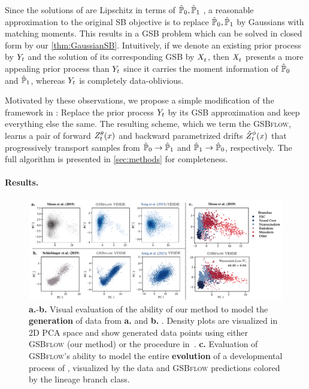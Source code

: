 Since the solutions of  are Lipschitz in terms of $\hat{\mathbb{P}}_{ {0} },\hat{\mathbb{P}}_{ {1}}$ \citep{carlier2022lipschitz}, a reasonable approximation to the original \acrshort{SB} objective is to replace $\hat{\mathbb{P}}_{ {0} },\hat{\mathbb{P}}_{ {1}}$ by Gaussians with matching moments. This results in a \acrshort{GSB} problem which can be solved in closed form by our \cref{thm:GaussianSB}. Intuitively, if we denote an existing prior process by $Y_{ t }$ and the solution of its corresponding \acrshort{GSB} by $X^{}_{ t }$, then $X^{}_{ t }$ presents a more appealing prior process than $Y_{ t }$ since it carries the moment information of $\hat{\mathbb{P}}_{ {0} }$ and $\hat{\mathbb{P}}_{ {1}}$, whereas $Y_{ t }$ is completely data-oblivious.


Motivated by these observations, we propose a simple modification of the framework in \citet{chen2021likelihood}: Replace the prior process $Y_{ t }$ by its \acrshort{GSB} approximation and keep everything else the same. The resulting scheme, which we term the \textsc{GSBflow}, learns a pair of forward {\color{pink} $\SBf$} and backward parametrized drifts {\color{blue} $\SBb$} that progressively transport samples from $\hat{\mathbb{P}}_{ {0} } \rightarrow \hat{\mathbb{P}}_{ {1}}$ and $\hat{\mathbb{P}}_{ {1}} \rightarrow \hat{\mathbb{P}}_{ {0} }$, respectively. The full algorithm is presented in \cref{sec:methods} for completeness.


\paragraph{Results.}
\label{sec:cell}


\begin{figure}
     \centering
     \includegraphics[width=\textwidth]{figures/fig_all_predictions.pdf}
    \caption{\textbf{a.}-\textbf{b.} Visual evaluation of the ability of our method to model the \textbf{generation} of data from \textbf{a.} \citet{moon2019visualizing} and \textbf{b.} \citet{schiebinger2019optimal}. Density plots are visualized in 2D PCA space and show generated data points using either \textsc{GSBflow} (our method) or the procedure in~\citet{song2020score}. \textbf{c.} Evaluation of \textsc{GSBflow}'s ability to model the entire \textbf{evolution} of a developmental process of \citet{moon2019visualizing}, visualized by the data and \textsc{GSBflow} predictions colored by the lineage branch class.}
    \label{fig:all_results}
\end{figure}

